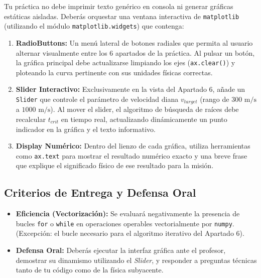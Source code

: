 	Tu práctica no debe imprimir texto genérico en consola ni generar gráficas estáticas aisladas. Deberás orquestar una ventana interactiva de \texttt{matplotlib} (utilizando el módulo \texttt{matplotlib.widgets}) que contenga:
	\begin{enumerate}
		\item \textbf{RadioButtons:} Un menú lateral de botones radiales que permita al usuario alternar visualmente entre los 6 apartados de la práctica. Al pulsar un botón, la gráfica principal debe actualizarse limpiando los ejes (\texttt{ax.clear()}) y ploteando la curva pertinente con sus unidades físicas correctas.
		\item \textbf{Slider Interactivo:} Exclusivamente en la vista del Apartado 6, añade un \texttt{Slider} que controle el parámetro de velocidad diana $v_{target}$ (rango de $300 \text{ m/s}$ a $1000 \text{ m/s}$). Al mover el slider, el algoritmo de búsqueda de raíces debe recalcular $t_{crit}$ en tiempo real, actualizando dinámicamente un punto indicador en la gráfica y el texto informativo.
		\item \textbf{Display Numérico:} Dentro del lienzo de cada gráfica, utiliza herramientas como \texttt{ax.text} para mostrar el resultado numérico exacto y una breve frase que explique el significado físico de ese resultado para la misión.
	\end{enumerate}
	
	\subsection*{Criterios de Entrega y Defensa Oral}
	
	\begin{itemize}
		\item \textbf{Eficiencia (Vectorización):} Se evaluará negativamente la presencia de bucles \texttt{for} o \texttt{while} en operaciones operables vectorialmente por \texttt{numpy}. (Excepción: el bucle necesario para el algoritmo iterativo del Apartado 6).
		\item \textbf{Defensa Oral:} Deberás ejecutar la interfaz gráfica ante el profesor, demostrar su dinamismo utilizando el \textit{Slider}, y responder a preguntas técnicas tanto de tu código como de la física subyacente.
	\end{itemize}
	